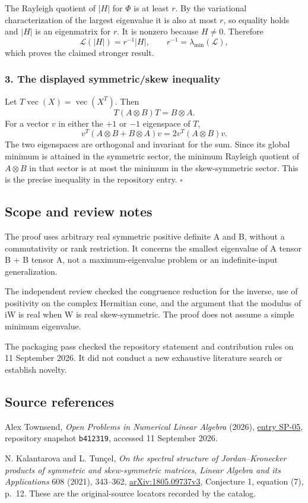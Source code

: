 \documentclass[10pt,a4paper]{article}
\begin{document}
The Rayleigh quotient of \(|H|\) for \(\Phi\) is at least \(r\). By the
variational characterization of the largest eigenvalue it is also at
most \(r\), so equality holds and \(|H|\) is an eigenmatrix for \(r\).
It is nonzero because \(H\ne0\). Therefore \[
\mathcal L(|H|)=r^{-1}|H|,
\qquad r^{-1}=\lambda_{\min}(\mathcal L),
\] which proves the claimed stronger result.

\subsubsection{3. The displayed symmetric/skew
inequality}\label{the-displayed-symmetricskew-inequality}

Let \(T\operatorname{vec}(X)=\operatorname{vec}(X^T)\). Then \[
T(A\otimes B)T=B\otimes A.
\] For a vector \(v\) in either the \(+1\) or \(-1\) eigenspace of
\(T\), \[
v^T(A\otimes B+B\otimes A)v=2v^T(A\otimes B)v.
\] The two eigenspaces are orthogonal and invariant for the sum. Since
its global minimum is attained in the symmetric sector, the minimum
Rayleigh quotient of \(A\otimes B\) in that sector is at most the
minimum in the skew-symmetric sector. This is the precise inequality in
the repository entry. \(\square\)

\subsection{Scope and review notes}\label{scope-and-review-notes}

The proof uses arbitrary real symmetric positive definite A and B,
without a commutativity or rank restriction. It concerns the smallest
eigenvalue of A tensor B + B tensor A, not a maximum-eigenvalue problem
or an indefinite-input generalization.

The independent review checked the congruence reduction for the inverse,
use of positivity on the complex Hermitian cone, and the argument that
the modulus of iW is real when W is real skew-symmetric. The proof does
not assume a simple minimum eigenvalue.

The packaging pass checked the repository statement and contribution
rules on 11 September 2026. It did not conduct a new exhaustive
literature search or establish novelty.

\subsection{Source references}\label{source-references}

Alex Townsend, \emph{Open Problems in Numerical Linear Algebra} (2026),
\href{https://github.com/ajt60gaibb/OpenProblemsInNLA/blob/b4123194697bdf6f8f82518c1dd7d6c40a30c2e0/eigenvalues-and-inverse-problems/SP-05/README.md}{entry
SP-05}, repository snapshot \texttt{b412319}, accessed 11 September
2026.

N. Kalantarova and L. Tunçel, \emph{On the spectral structure of
Jordan--Kronecker products of symmetric and skew-symmetric matrices},
\emph{Linear Algebra and its Applications} 608 (2021), 343--362,
\href{https://arxiv.org/abs/1805.09737v3}{arXiv:1805.09737v3},
Conjecture 1, equation (7), p.~12. These are the original-source
locators recorded by the catalog.
\end{document}
